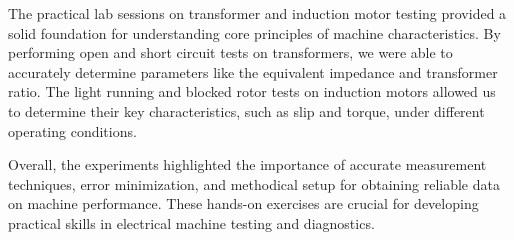 \documentclass[12pt,a4paper]{report}
\begin{document}
The practical lab sessions on transformer and induction motor testing provided a solid foundation for understanding core principles of machine characteristics. By performing open and short circuit tests on transformers, we were able to accurately determine parameters like the equivalent impedance and transformer ratio. The light running and blocked rotor tests on induction motors allowed us to determine their key characteristics, such as slip and torque, under different operating conditions.

Overall, the experiments highlighted the importance of accurate measurement techniques, error minimization, and methodical setup for obtaining reliable data on machine performance. These hands-on exercises are crucial for developing practical skills in electrical machine testing and diagnostics.

\nocite{*}            
  
 
\end{document}
